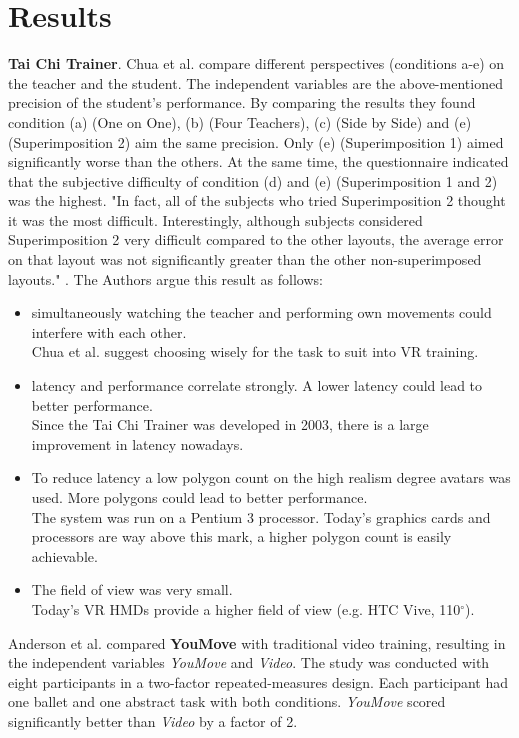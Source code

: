 \section{Results}
\textbf{Tai Chi Trainer}. Chua et al. compare different perspectives (conditions a-e) on the teacher and the student. The independent variables are the above-mentioned precision of the student's performance. By comparing the results they found condition (a) (One on One), (b) (Four Teachers), (c) (Side by Side) and (e) (Superimposition 2) aim the same precision. Only (e) (Superimposition 1) aimed significantly worse than the others. At the same time, the questionnaire indicated that the subjective difficulty of condition (d) and (e) (Superimposition 1 and 2) was the highest. "In fact, all of the subjects who tried Superimposition 2 thought it was the most difficult. Interestingly, although subjects considered Superimposition 2 very difficult compared to the other layouts, the average error on that layout was not significantly greater than the other non-superimposed layouts." \cite{Chua2003}. The Authors argue this result as follows:
\begin{itemize}
	\item simultaneously watching the teacher and performing own movements could interfere with each other.\\
	Chua et al. suggest choosing wisely for the task to suit into VR training.
	\item latency and performance correlate strongly. A lower latency could lead to better performance.\\
	Since the Tai Chi Trainer was developed in 2003, there is a large improvement in latency nowadays.
	\item To reduce latency a low polygon count on the high realism degree avatars was used. More polygons could lead to better performance.\\
	The system was run on a Pentium 3 processor. Today's graphics cards and processors are way above this mark, a higher polygon count is easily achievable.
	\item The field of view was very small.\\
	Today's VR HMDs provide a higher field of view (e.g. HTC Vive, 110$^\circ$).
\end{itemize}
Anderson et al. compared \textbf{YouMove} with traditional video training, resulting in the independent variables \textit{YouMove} and \textit{Video}. The study was conducted with eight participants in a two-factor repeated-measures design. Each participant had one ballet and one abstract task with both conditions. \textit{YouMove} scored significantly better than \textit{Video} by a factor of 2.\\ \\
